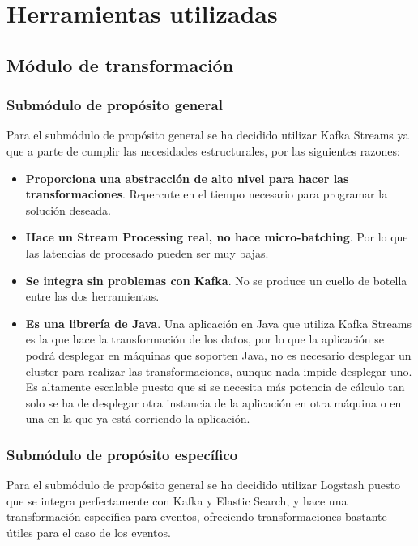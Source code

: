 \section{Herramientas utilizadas}

\subsection{Módulo de transformación}
\subsubsection{Submódulo de propósito general}
Para el submódulo de propósito general se ha decidido utilizar Kafka Streams\cite{Tfg:kafkastreams} ya que a parte de cumplir las necesidades estructurales, por las siguientes razones:

\begin{itemize}
	\item \textbf{Proporciona una abstracción de alto nivel para hacer las transformaciones}. Repercute en el tiempo necesario para programar la solución deseada.
	
	\item \textbf{Hace un Stream Processing real, no hace micro-batching}. Por lo que las latencias de procesado pueden ser muy bajas.
	
	\item \textbf{Se integra sin problemas con Kafka}. No se produce un cuello de botella entre las dos herramientas.
	
	\item \textbf{Es una librería de Java}. Una aplicación en Java que utiliza Kafka Streams es la que hace la transformación de los datos, por lo que la aplicación se podrá desplegar en máquinas que soporten Java, no es necesario desplegar un cluster para realizar las transformaciones, aunque nada impide desplegar uno. Es altamente escalable puesto que si se necesita más potencia de cálculo tan solo se ha de desplegar otra instancia de la aplicación en otra máquina o en una en la que ya está corriendo la aplicación.
\end{itemize}



\subsubsection{Submódulo de propósito específico}
Para el submódulo de propósito general se ha decidido utilizar Logstash puesto que se integra perfectamente con Kafka y Elastic Search, y hace una transformación específica para eventos, ofreciendo transformaciones bastante útiles para el caso de los eventos.

